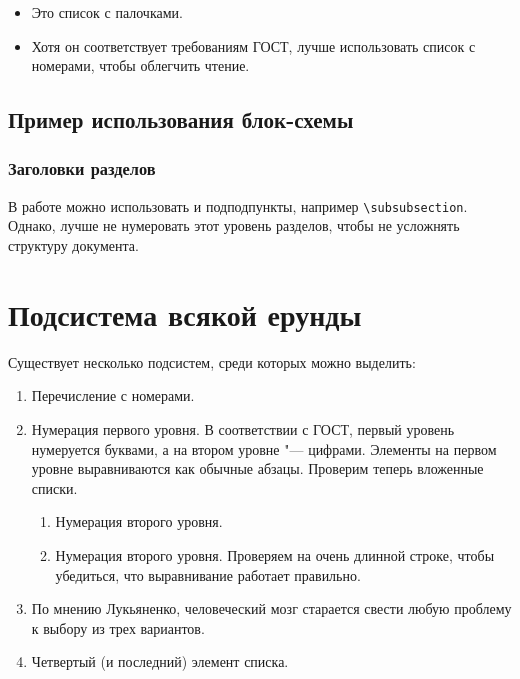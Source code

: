 \begin{itemize}
\item Это список с палочками. 
\item Хотя он соответствует требованиям ГОСТ, лучше использовать список с номерами, чтобы облегчить чтение.
\end{itemize}

\subsection{Пример использования блок-схемы}

\subsubsection*{Заголовки разделов}

В работе можно использовать и подподпункты, например \verb|\subsubsection|. Однако, лучше не нумеровать этот уровень разделов, чтобы не усложнять структуру документа.

\section{Подсистема всякой ерунды}

Существует несколько подсистем, среди которых можно выделить:

\begin{enumerate}
\item Перечисление с номерами.
\item Нумерация первого уровня. В соответствии с ГОСТ, первый уровень нумеруется буквами, а на втором уровне "--- цифрами. Элементы на первом уровне выравниваются как обычные абзацы. Проверим теперь вложенные списки.
\begin{enumerate}
\item Нумерация второго уровня.
\item Нумерация второго уровня. Проверяем на очень длинной строке, чтобы убедиться, что выравнивание работает правильно.
\end{enumerate}
\item По мнению Лукьяненко, человеческий мозг старается свести любую проблему к выбору из трех вариантов.
\item Четвертый (и последний) элемент списка.
\end{enumerate}

